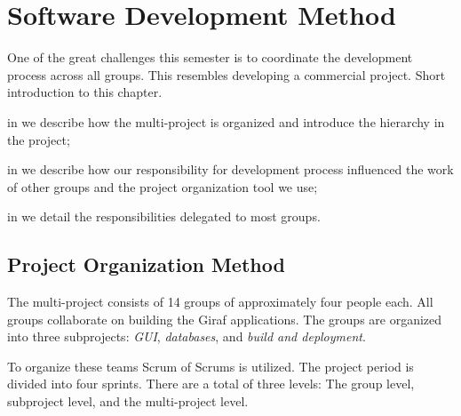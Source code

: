 \chapter{Software Development Method}\label{chap:sw_dev_method}

One of the great challenges this semester is to coordinate the development process across all groups. This resembles developing a commercial project. 
Short introduction to this chapter. \dummy~\dummy~\dummy~\dummy~\dummy~\dummy

\begin{chapterorganization}
  \item in  we describe how the multi-project is organized and introduce the hierarchy in the project;
  \item in  we describe how our responsibility for development process influenced the work of other groups and the project organization tool we use;
  \item in  we detail the responsibilities delegated to most groups.
\end{chapterorganization}

\section{Project Organization Method}\label{sec:project_overview}
The multi-project consists of 14 groups of approximately four people each. All groups collaborate on building the Giraf applications. The groups are organized into three subprojects: \emph{GUI}, \emph{databases}, and \emph{build and deployment}.

To organize these teams Scrum of Scrums  is utilized.  The project period is divided into four sprints. There are a total of three levels: The group level, subproject level, and the multi-project level.

